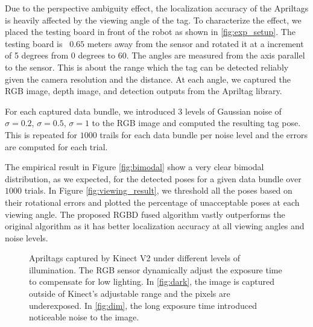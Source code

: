 Due to the perspective ambiguity effect, the localization accuracy of the Apriltags is heavily affected by the viewing angle of the tag. To characterize the effect, we placed the testing board in front of the robot as shown in \ref{fig:exp_setup}. The testing board is ~$0.65$ meters away from the sensor and rotated it at a increment of 5 degrees from 0 degrees to 60. The angles are measured from the axis parallel to the sensor. This is about the range which the tag can be detected reliably given the camera resolution and the distance. At each angle, we captured the RGB image, depth image, and detection outputs from the Apriltag library. 

For each captured data bundle, we introduced 3 levels of Gaussian noise of $\sigma = 0.2$, $\sigma = 0.5$, $\sigma = 1$  to the RGB image and computed the resulting tag pose. This is repeated for $1000$ trails for each data bundle per noise level and the errors are computed for each trial.  

The empirical result in Figure \ref{fig:bimodal} show a very clear bimodal distribution, as we expected, for the detected poses for a given data bundle over $1000$ trials. In Figure \ref{fig:viewing_result}, we threshold all the poses based on their rotational errors and plotted the percentage of unacceptable poses at each viewing angle. The proposed RGBD fused algorithm vastly outperforms the original algorithm as it has better localization accuracy at all viewing angles and noise levels. 

\begin{figure}
\centering
{}
\caption{Apriltags captured by Kinect V2 under different levels of illumination. The RGB sensor dynamically adjust the exposure time to compensate for low lighting. In \ref{fig:dark}, the image is captured outside of Kinect's adjustable range and the pixels are underexposed. In \ref{fig:dim}, the long exposure time introduced noticeable noise to the image. }
\label{fig:illumination_tag}
\end{figure}


